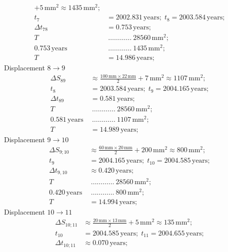\begin{description}
\begin{align*}
      + 5\,\mathrm{mm}^2 \approx 1435\,\mathrm{mm}^2;\\
    t_7 &= 2002.831\,\mathrm{years};\; t_8 = 2003.584\,\mathrm{years};\\
    \Delta t_{78} &= 0.753\,\mathrm{years};\\
    T\ &\ \dots\dots\dots\dots\ 28560\,\mathrm{mm}^2;\\
    0.753\,\mathrm{years}\ &\ \dots\dots\dots\dots\ 1435\,\mathrm{mm}^2;\\
    T &= 14.986\,\mathrm{years};
  \end{align*}
  Displacement $8 \rightarrow 9$
  \begin{align*}
    \Delta S_{89} &\approx \frac{100\,\mathrm{mm}\times22\,\mathrm{mm}}{2}
      + 7\,\mathrm{mm}^2 \approx 1107\,\mathrm{mm}^2;\\
    t_8 &= 2003.584\,\mathrm{years};\; t_9 = 2004.165\,\mathrm{years};\\
    \Delta t_{89} &= 0.581\,\mathrm{years};\\
    T\ &\ \dots\dots\dots\dots\ 28560\,\mathrm{mm}^2;\\
    0.581\,\mathrm{years}\ &\ \dots\dots\dots\dots\ 1107\,\mathrm{mm}^2;\\
    T &= 14.989\,\mathrm{years};
  \end{align*}
  Displacement $9 \rightarrow 10$
  \begin{align*}
    \Delta S_{9;10} &\approx \frac{60\,\mathrm{mm}\times20\,\mathrm{mm}}{2}
      + 200\,\mathrm{mm}^2 \approx 800\,\mathrm{mm}^2;\\
    t_9 &= 2004.165\,\mathrm{years};\; t_{10} = 2004.585\,\mathrm{years};\\
    \Delta t_{9,10} &\approx 0.420\,\mathrm{years};\\
    T\ &\ \dots\dots\dots\dots\ 28560\,\mathrm{mm}^2;\\
    0.420\,\mathrm{years}\ &\ \dots\dots\dots\dots\ 800\,\mathrm{mm}^2;\\
    T &= 14.994\,\mathrm{years};
  \end{align*}
  Displacement $10 \rightarrow 11$
  \begin{align*}
    \Delta S_{10;11} &\approx \frac{20\,\mathrm{mm}\times13\,\mathrm{mm}}{2}
      + 5\,\mathrm{mm}^2 \approx 135\,\mathrm{mm}^2;\\
    t_{10} &= 2004.585\,\mathrm{years};\; t_{11} = 2004.655\,\mathrm{years};\\
    \Delta t_{10;11} &\approx 0.070\,\mathrm{years};\\

\end{align*}
\end{description}
